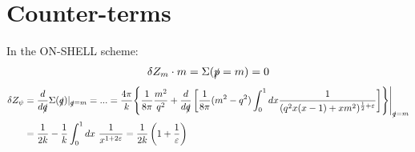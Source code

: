 \documentclass[a4paper,11pt,DIV=12]{scrartcl}
\begin{document}
\newpage

\section{Counter-terms}
In the ON-SHELL scheme:
\begin{align*}
    \delta Z_m \cdot m = \Sigma(\slashed{p}=m) = 0
\end{align*}
\begin{align*}
    \delta Z_\psi &= \frac{d}{d \slashed{q}}\Sigma(\slashed{q})|_{\slashed{q}=m} =...=\frac{4 \pi}{k}\Biggl\{ \frac{1}{8\pi}\frac{m^2}{q^2} + \frac{d}{d\slashed{q}}\left[ \frac{1}{8 \pi} (m^2-q^2) \int_0^1 dx \frac{1}{(q^2 x (x-1)+xm^2)^{\frac{1}{2}+\varepsilon}}  \right]  \Biggr\}\Bigg| _{\slashed{q}=m}
    \\ &=\frac{1}{2k} -\frac{1}{k} \int_0^1 dx\  \frac{1}{x^{1+2\varepsilon}}=\frac{1}{2k}\left(1+\frac{1}{\varepsilon}\right)
\end{align*}


% 
% 
\end{document}
